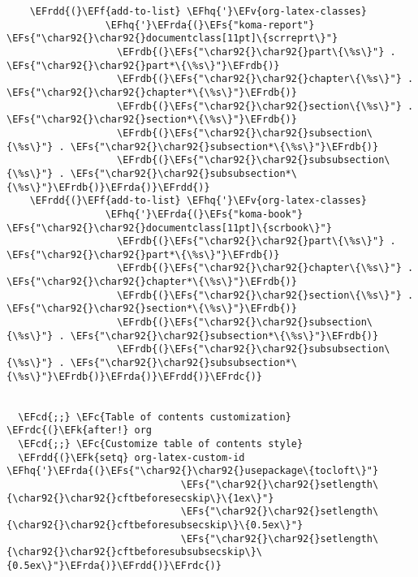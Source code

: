 \documentclass{article}
\newcommand{\EFc}[1]{\textcolor{EFc}{#1}} %
\newcommand{\EFcd}[1]{\textcolor{EFcd}{#1}} %
\newcommand{\EFs}[1]{\textcolor{EFs}{#1}} %
\newcommand{\EFk}[1]{\textcolor{EFk}{#1}} %
\newcommand{\EFf}[1]{\textcolor{EFf}{#1}} %
\newcommand{\EFv}[1]{\textcolor{EFv}{#1}} %
\newcommand{\EFhq}[1]{#1} %
\newcommand{\EFrda}[1]{\textcolor{EFrda}{#1}} %
\newcommand{\EFrdb}[1]{\textcolor{EFrdb}{#1}} %
\newcommand{\EFrdc}[1]{\textcolor{EFrdc}{#1}} %
\newcommand{\EFrdd}[1]{\textcolor{EFrdd}{#1}} %
\begin{document}
\begin{Code}
\begin{Verbatim}
    \EFrdd{(}\EFf{add-to-list} \EFhq{'}\EFv{org-latex-classes}
                 \EFhq{'}\EFrda{(}\EFs{"koma-report"} \EFs{"\char92{}\char92{}documentclass[11pt]\{scrreprt\}"}
                   \EFrdb{(}\EFs{"\char92{}\char92{}part\{\%s\}"} . \EFs{"\char92{}\char92{}part*\{\%s\}"}\EFrdb{)}
                   \EFrdb{(}\EFs{"\char92{}\char92{}chapter\{\%s\}"} . \EFs{"\char92{}\char92{}chapter*\{\%s\}"}\EFrdb{)}
                   \EFrdb{(}\EFs{"\char92{}\char92{}section\{\%s\}"} . \EFs{"\char92{}\char92{}section*\{\%s\}"}\EFrdb{)}
                   \EFrdb{(}\EFs{"\char92{}\char92{}subsection\{\%s\}"} . \EFs{"\char92{}\char92{}subsection*\{\%s\}"}\EFrdb{)}
                   \EFrdb{(}\EFs{"\char92{}\char92{}subsubsection\{\%s\}"} . \EFs{"\char92{}\char92{}subsubsection*\{\%s\}"}\EFrdb{)}\EFrda{)}\EFrdd{)}
    \EFrdd{(}\EFf{add-to-list} \EFhq{'}\EFv{org-latex-classes}
                 \EFhq{'}\EFrda{(}\EFs{"koma-book"} \EFs{"\char92{}\char92{}documentclass[11pt]\{scrbook\}"}
                   \EFrdb{(}\EFs{"\char92{}\char92{}part\{\%s\}"} . \EFs{"\char92{}\char92{}part*\{\%s\}"}\EFrdb{)}
                   \EFrdb{(}\EFs{"\char92{}\char92{}chapter\{\%s\}"} . \EFs{"\char92{}\char92{}chapter*\{\%s\}"}\EFrdb{)}
                   \EFrdb{(}\EFs{"\char92{}\char92{}section\{\%s\}"} . \EFs{"\char92{}\char92{}section*\{\%s\}"}\EFrdb{)}
                   \EFrdb{(}\EFs{"\char92{}\char92{}subsection\{\%s\}"} . \EFs{"\char92{}\char92{}subsection*\{\%s\}"}\EFrdb{)}
                   \EFrdb{(}\EFs{"\char92{}\char92{}subsubsection\{\%s\}"} . \EFs{"\char92{}\char92{}subsubsection*\{\%s\}"}\EFrdb{)}\EFrda{)}\EFrdd{)}\EFrdc{)}


  \EFcd{;;} \EFc{Table of contents customization}
\EFrdc{(}\EFk{after!} org
  \EFcd{;;} \EFc{Customize table of contents style}
  \EFrdd{(}\EFk{setq} org-latex-custom-id \EFhq{'}\EFrda{(}\EFs{"\char92{}\char92{}usepackage\{tocloft\}"}
                              \EFs{"\char92{}\char92{}setlength\{\char92{}\char92{}cftbeforesecskip\}\{1ex\}"}
                              \EFs{"\char92{}\char92{}setlength\{\char92{}\char92{}cftbeforesubsecskip\}\{0.5ex\}"}
                              \EFs{"\char92{}\char92{}setlength\{\char92{}\char92{}cftbeforesubsubsecskip\}\{0.5ex\}"}\EFrda{)}\EFrdd{)}\EFrdc{)}


\end{Verbatim}
\end{Code}
\end{document}
